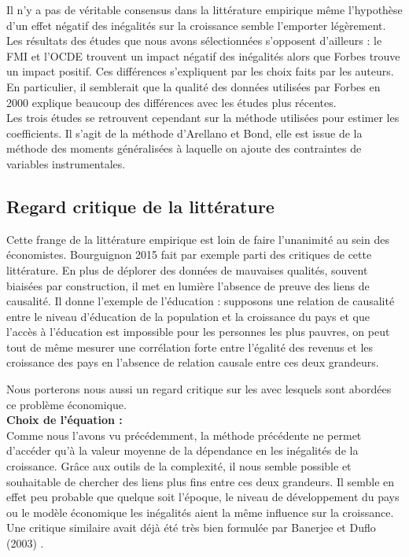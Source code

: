 \documentclass[11pt,a4paper]{article}
\begin{document}
Il n'y a pas de véritable consensus dans la littérature empirique même l'hypothèse d'un effet négatif des inégalités sur la croissance semble l'emporter légèrement. Les résultats des études que nous avons sélectionnées s'opposent d'ailleurs : le FMI et l'OCDE trouvent un impact négatif des inégalités alors que Forbes trouve un impact positif. Ces différences s'expliquent par les choix faits par les auteurs. En particulier, il semblerait que la qualité des données utilisées par Forbes en 2000 explique beaucoup des différences avec les études plus récentes. \\

Les trois études se retrouvent cependant sur la méthode utilisées pour estimer les coefficients. Il s'agit de la méthode d'Arellano et Bond, elle est issue de la méthode des moments généralisées à laquelle on ajoute des contraintes de variables instrumentales. 

\subsection{Regard critique de la littérature}

Cette frange de la littérature empirique est loin de faire l'unanimité au sein des économistes. Bourguignon 2015 \cite{bourguinon2015} fait par exemple parti des critiques de cette littérature. En plus de déplorer des données de mauvaises qualités, souvent biaisées par construction, il met en lumière l'absence de preuve des liens de causalité. Il donne l'exemple de l'éducation : supposons une relation de causalité entre le niveau d'éducation de la population et la croissance du pays et que l'accès à l'éducation est impossible pour les personnes les plus pauvres, on peut tout de même mesurer une corrélation forte entre l'égalité des revenus et les croissance des pays en l'absence de relation causale entre ces deux grandeurs. 

Nous porterons nous aussi un regard critique sur les avec lesquels sont abordées ce problème économique. \\

\textbf{Choix de l'équation :} \\
Comme nous l'avons vu précédemment, la méthode précédente ne permet d'accéder qu'à la valeur moyenne de la dépendance en les inégalités de la croissance. Grâce aux outils de la complexité, il nous semble possible et souhaitable de chercher des liens plus fins entre ces deux grandeurs. Il semble en effet peu probable que quelque soit l'époque, le niveau de développement du pays ou le modèle économique les inégalités aient la même influence sur la croissance. Une critique similaire avait déjà été très bien formulée par Banerjee et Duflo (2003) \cite{banerjee}. 
\end{document}
